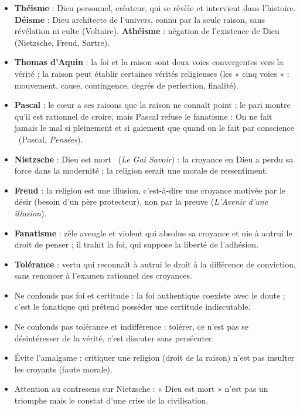 \documentclass[11pt]{article}
\newcommand{\cle}[1]{{\popxbold\color{popdark}#1}}
\newcounter{popsec}
\newcounter{popsub}
\newcommand{\courssub}[1]{%
  \stepcounter{popsub}%
  \par\vspace{9pt}\noindent{\popxbold\fontsize{11.5}{13}\selectfont\color{popink}{\color{poporange}\thepopsec.\thepopsub}\hspace{6pt}#1}\par\nopagebreak\vspace{4pt}
}
\begin{document}
\courssub{Ressources à mobiliser}

\begin{aretenir}
\begin{itemize}
  \item \textbf{Théisme} : Dieu personnel, créateur, qui se révèle et intervient dans l'histoire. \textbf{Déisme} : Dieu architecte de l'univers, connu par la seule raison, sans révélation ni culte (Voltaire). \textbf{Athéisme} : négation de l'existence de Dieu (Nietzsche, Freud, Sartre).
  \item \textbf{Thomas d'Aquin} : la foi et la raison sont deux voies convergentes vers la vérité ; la raison peut établir certaines vérités religieuses (les « cinq voies » : mouvement, cause, contingence, degrés de perfection, finalité).
  \item \textbf{Pascal} : le cœur a ses raisons que la raison ne connaît point ; le pari montre qu'il est rationnel de croire, mais Pascal refuse le fanatisme : \guillemotleft On ne fait jamais le mal si pleinement et si gaiement que quand on le fait par conscience \guillemotright\ (Pascal, \emph{Pensées}).
  \item \textbf{Nietzsche} : \guillemotleft Dieu est mort \guillemotright\ (\emph{Le Gai Savoir}) : la croyance en Dieu a perdu sa force dans la modernité ; la religion serait une morale de ressentiment.
  \item \textbf{Freud} : la religion est une illusion, c'est-à-dire une croyance motivée par le désir (besoin d'un père protecteur), non par la preuve (\emph{L'Avenir d'une illusion}).
  \item \textbf{Fanatisme} : zèle aveugle et violent qui absolue sa croyance et nie à autrui le droit de penser ; il trahit la foi, qui suppose la liberté de l'adhésion.
  \item \textbf{Tolérance} : vertu qui reconnaît à autrui le droit à la différence de conviction, sans renoncer à l'examen rationnel des croyances.
\end{itemize}
\end{aretenir}

\begin{attention}
\begin{itemize}
  \item Ne confonds pas \cle{foi} et \cle{certitude} : la foi authentique coexiste avec le doute ; c'est le fanatique qui prétend posséder une certitude indiscutable.
  \item Ne confonds pas \cle{tolérance} et \cle{indifférence} : tolérer, ce n'est pas se désintéresser de la vérité, c'est discuter sans persécuter.
  \item Évite l'amalgame : critiquer une religion (droit de la raison) n'est pas insulter les croyants (faute morale).
  \item Attention au contresens sur Nietzsche : « Dieu est mort » n'est pas un triomphe mais le constat d'une crise de la civilisation.
\end{itemize}
\end{attention}
\end{document}
